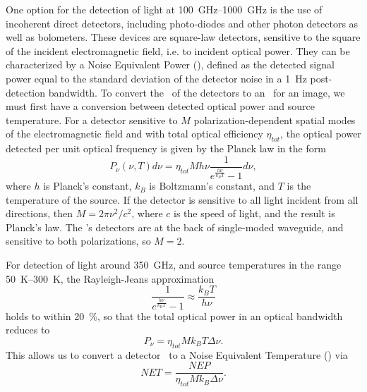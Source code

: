 One option for the detection of light at \SIrange{100}{1000}{\GHz} is the use of incoherent direct detectors, including photo-diodes and other photon detectors as well as bolometers.
These devices are square-law detectors, sensitive to the square of the incident electromagnetic field, i.e. to incident optical power.
They can be characterized by a Noise Equivalent Power (\NEP), defined as the detected signal power equal to the standard deviation of the detector noise in a \SI{1}{\Hz} post-detection bandwidth.
To convert the \NEP\ of the detectors to an \NETD\ for an image, we must first have a conversion between detected optical power and source temperature.
For a detector sensitive to $M$ polarization-dependent spatial modes of the electromagnetic field and with total optical efficiency $\eta_{tot}$, the optical power detected per unit optical frequency is given by the Planck law in the form \cite{richards_bolometers_1994}
\begin{equation} \label{eqn:ch1-planck}
  P_{\nu}(\nu,T) d \nu = \eta_{tot} M h \nu \frac{1}{e^{\frac{h \nu}{k_B T}} - 1} d \nu,
\end{equation}
where $h$ is Planck's constant, $k_B$ is Boltzmann's constant, and $T$ is the temperature of the source.
If the detector is sensitive to all light incident from all directions, then $M = 2 \pi \nu^2 / c^2$, where $c$ is the speed of light, and the result is Planck's law.
The \Imager's detectors are at the back of single-moded waveguide, and sensitive to both polarizations, so $M=2$.

For detection of light around \SI{350}{\GHz}, and source temperatures in the range \SIrange{50}{300}{\K}, the Rayleigh-Jeans approximation
\begin{equation}
  \frac{1}{e^{\frac{h \nu}{k_B T}} - 1} \approx \frac{k_B T}{h \nu}
\end{equation}
holds to within \SI{20}{\percent}, so that the total optical power in an optical bandwidth reduces to 
\begin{equation}
  P_{\nu} = \eta_{tot} M k_B T \Delta \nu.
\end{equation}
This allows us to convert a detector \NEP\ to a Noise Equivalent Temperature (\NET) via
\begin{equation}
  NET = \frac{NEP}{\eta_{tot} M k_B \Delta \nu}.
\end{equation}

